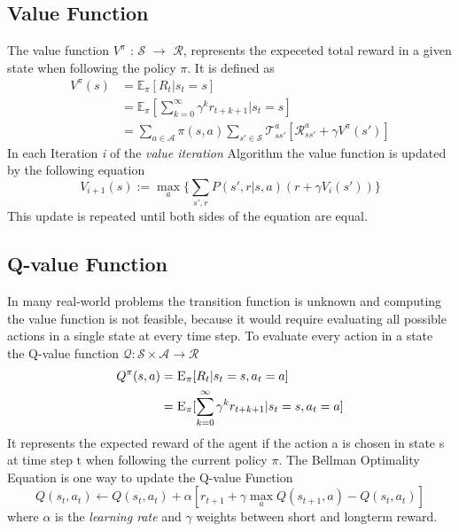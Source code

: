 \subsection{Value Function}
The value function $V^{\pi}$ : $\mathcal{S}$ $\rightarrow$ $\mathcal{R}$, represents the expeceted total reward in a given state when following the policy $\pi$.
It is defined as
 \begin{equation}
  \begin{aligned}
    V^{\pi}(s) &= \mathbb{E}_{\pi} [R_t | s_t = s] \\
    &= \mathbb{E}_{\pi} [\sum^{\infty}_{k=0} \gamma^{k} r_{t+k+1} | s_t = s] \label{MDP:eq1} \\
    &= \sum_{a \in \mathcal{A}} \pi(s, a) \sum_{s' \in \mathcal{S}} \mathcal{T}^{a}_{ss'}[\mathcal{R}^{a}_{ss'} + \gamma V^\pi(s')]
  \end{aligned}
\end{equation}
In each Iteration \textit{i} of the \textit{value iteration} Algorithm the value function is updated by the following equation
\begin{equation}
  V_{i+1}(s) := \max_a \Big\{ \sum_{s', r} P(s',r| s,a) (r + \gamma V_i(s')) \Big\}
\end{equation}
This update is repeated until both sides of the equation are equal.
\subsection{Q-value Function}
In many real-world problems the transition function is unknown and computing the value function is not feasible, because
it would require evaluating all possible actions in a single state at every time step.
To evaluate every action in a state the Q-value function $ \mathcal{Q}: \mathcal{S} \times \mathcal{A} \rightarrow \mathcal{R} $
\begin{align}
  Q^{\pi}(s, a) &= \textsc{E}_\pi[R_t | s_t = s, a_t = a] \\
  &= \textsc{E}_\pi [\sum^\infty_{k=0} \gamma^k r_{t+k+1} | s_t = s, a_t = a]
\end{align}
It represents the expected reward of the agent if the action a is chosen in state s at time step t when following the current policy $\pi$.
The Bellman Optimality Equation is one way to update the Q-value Function 
\begin{equation}
  Q(s_t, a_t) \leftarrow Q(s_t, a_t) + \alpha[r_{t+1} + \gamma \max_a Q(s_{t+1}, a) - Q(s_t, a_t)]
\end{equation}
where $ \alpha$ is the \textit{learning rate} and $\gamma$ weights between short and longterm reward.

